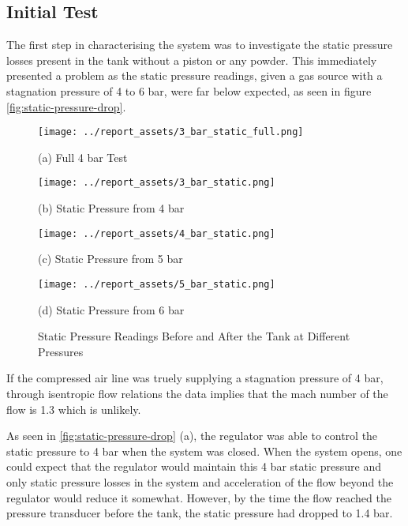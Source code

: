 \subsection{Initial Test}
The first step in characterising the system was to investigate the static pressure losses present in the tank without a piston or any powder. This immediately presented a problem as the static pressure readings, given a gas source with a stagnation pressure of 4 to 6 bar, were far below expected, as seen in figure \autoref{fig:static-pressure-drop}. 
\begin{figure}[htbp]
    \centering

    \begin{minipage}{0.45\textwidth}
        \centering
        \texttt{[image: ../report\_assets/3\_bar\_static\_full.png]}
        \caption*{(a) Full 4 bar Test}
    \end{minipage}    
    \hfill
    \begin{minipage}{0.45\textwidth}
        \centering
        \texttt{[image: ../report\_assets/3\_bar\_static.png]}
        \caption*{(b) Static Pressure from 4 bar}
    \end{minipage}    
    \begin{minipage}{0.45\textwidth}
        \centering
        \texttt{[image: ../report\_assets/4\_bar\_static.png]}
        \caption*{(c) Static Pressure from 5 bar}
    \end{minipage}    
    \hfill
    \begin{minipage}{0.45\textwidth}
        \centering
        \texttt{[image: ../report\_assets/5\_bar\_static.png]}
        \caption*{(d) Static Pressure from 6 bar}
    \end{minipage}    

    \caption{Static Pressure Readings Before and After the Tank at Different Pressures}\label{fig:static-pressure-drop}
\end{figure}    
If the compressed air line was truely supplying a stagnation pressure of 4 bar, through isentropic flow relations the data implies that the mach number of the flow is 1.3 which is unlikely.

As seen in \autoref{fig:static-pressure-drop} (a), the regulator was able to control the static pressure to 4 bar when the system was closed. When the system opens, one could expect that the regulator would maintain this 4 bar static pressure and only static pressure losses in the system and acceleration of the flow beyond the regulator would reduce it somewhat. However, by the time the flow reached the pressure transducer before the tank, the static pressure had dropped to 1.4 bar. 

